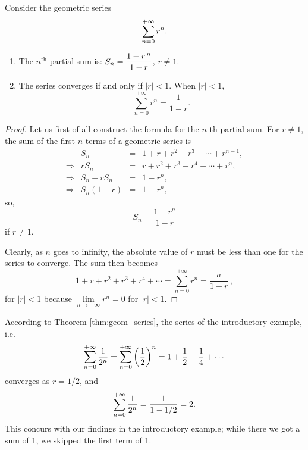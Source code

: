 \begin{theorem}\label{thm:geom_series}
Consider the geometric series $$\displaystyle \sum_{n=0}^{+\infty} r^n.$$
\begin{enumerate}
\item		The $n^\text{th}$ partial sum is: $\displaystyle S_n = \frac{1-r\,^{n}}{1-r}$, $r\neq 1$.
\item		The series converges if and only if $|r| < 1$. When $|r|<1$, 
$$\sum_{n=0}^{+\infty} r^n = \frac{1}{1-r}.$$
\end{enumerate}
\end{theorem}

\ifanalysis

\begin{proof}
Let us first of all construct the formula for the $n$-th partial sum. For $r\neq 1$, the sum of the first $n$ terms of a geometric series is 
$$
\displaystyle{\begin{array}{rrcl}
& S_n & =& 1+r+r^{2}+r^{3}+\cdots+r^{n-1},\\
\Rightarrow & rS_n & = & r+r^{2}+r^{3}+r^{4}+\cdots +r^{n},\\
\Rightarrow & S_n-rS_n & = & 1-r^{n},\\
\Rightarrow &  S_n(1-r)& = &1-r^{n},\end{array} }
$$
so,
$$
\displaystyle S_n=\frac {1-r^{n}}{1-r}
$$
if $r\neq 1$.

Clearly, as $n$ goes to infinity, the absolute value of $r$ must be less than one for the series to converge. The sum then becomes
$$
1+r+r^{2}+r^{3}+r^{4}+\cdots =\sum _{n=0}^{+\infty }r^{n}={\frac {a}{1-r}}\,,
$$
for $\left|r\right|<1$	because $\lim\limits_{n\to+\infty} r^n=0$ for $\left|r\right|<1$. 
\end{proof}

\fi

According to Theorem \ref{thm:geom_series}, the series of the introductory example, i.e.
$$\displaystyle\sum_{n=0}^{+\infty} \frac{1}{2^n} =\sum_{n=0}^{+\infty} \left(\frac 12\right)^n= 1+\frac12+\frac14+\cdots$$ converges as $r=1/2$, and $$\displaystyle \sum_{n=0}^{+\infty} \frac{1}{2^n} = \frac{1}{1-1/2} = 2.$$ This concurs with our findings in the introductory example; while there we got a sum of 1, we skipped the first term of 1.

